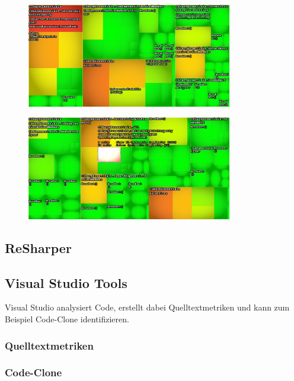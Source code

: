 \begin{figure}[ht]
	\centering
	\includegraphics[width=0.8\textwidth]{images/nd-cyclomatic-complexity.png}
	\caption{}
	\vspace{0.1cm}
	\label{fig:nd-cyclomatic-complexity}
\end{figure}

\begin{figure}[ht]
	\centering
	\includegraphics[width=0.8\textwidth]{images/nd-il-cyclomatic-complexity.png}
	\caption{}
	\vspace{0.1cm}
	\label{fig:nd-il-cyclomatic-complexity}
\end{figure}

\subsection{ReSharper}


\subsection{Visual Studio Tools}
Visual Studio analysiert Code, erstellt dabei Quelltextmetriken und kann zum Beispiel Code-Clone identifizieren.

\subsubsection{Quelltextmetriken}

\subsubsection{Code-Clone}


